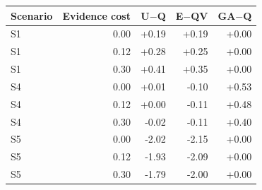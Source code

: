 \begin{tabular}{@{}lrrrr@{}}
\toprule
Scenario & Evidence cost & U$-$Q & E$-$QV & GA$-$Q \\
\midrule
S1 & 0.00 & +0.19 & +0.19 & +0.00 \\
S1 & 0.12 & +0.28 & +0.25 & +0.00 \\
S1 & 0.30 & +0.41 & +0.35 & +0.00 \\
S4 & 0.00 & +0.01 & -0.10 & +0.53 \\
S4 & 0.12 & +0.00 & -0.11 & +0.48 \\
S4 & 0.30 & -0.02 & -0.11 & +0.40 \\
S5 & 0.00 & -2.02 & -2.15 & +0.00 \\
S5 & 0.12 & -1.93 & -2.09 & +0.00 \\
S5 & 0.30 & -1.79 & -2.00 & +0.00 \\
\bottomrule
\end{tabular}